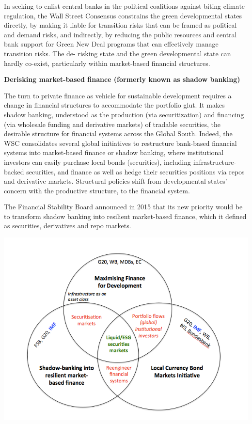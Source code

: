 \documentclass[
]{book}
\begin{document}
In seeking to enlist central banks in the political coalitions against biting climate
regulation, the Wall Street Consensus constrains the green developmental states
directly, by making it liable for transition risks that can be framed as political and
demand risks, and indirectly, by reducing the public resources and central bank support
for Green New Deal programs that can effectively manage transition risks. The de-
risking state and the green developmental state can hardly co-exist, particularly within
market-based financial structures.

\textbf{Derisking market-based finance (formerly known as shadow banking)}

The turn to private finance as vehicle for sustainable development requires a change in
financial structures to accommodate the portfolio glut. It makes shadow banking,
understood as the production (via securitization) and financing (via wholesale funding
and derivative markets) of tradable securities, the desirable structure for financial
systems across the Global South. Indeed, the WSC consolidates
several global initiatives to restructure bank-based financial systems into market-based
finance or shadow banking,
where institutional investors can easily purchase local bonds (securities), including
infrastructure-backed securities, and finance as well as hedge their securities positions
via repos and derivative markets. Structural policies shift from developmental states'
concern with the productive structure, to the financial system.

The Financial Stability Board announced in 2015 that its new priority would be to transform
shadow banking into resilient market-based finance, which it defined as securities,
derivatives and repo markets.

\includegraphics{fig/new_development_finance.png}
\end{document}
